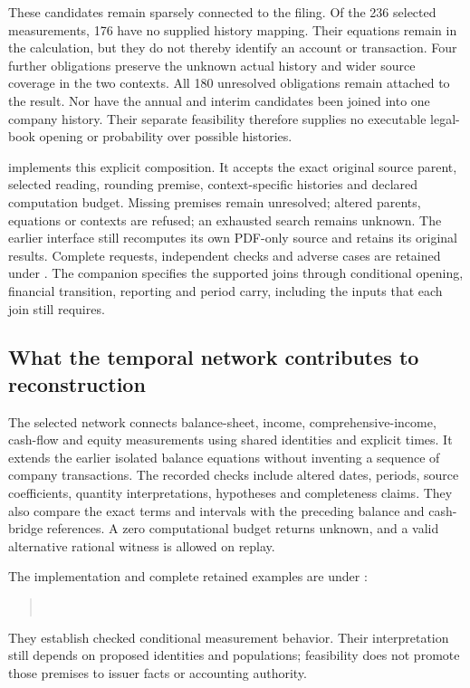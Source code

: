 These candidates remain sparsely connected to the filing. Of the 236 selected
measurements, 176 have no supplied history mapping. Their equations remain
in the calculation, but they do not thereby identify an account or transaction.
Four further obligations preserve the unknown actual history and wider source
coverage in the two contexts. All 180 unresolved obligations remain attached
to the result. Nor have the annual and interim candidates been joined into one
company history. Their separate feasibility therefore supplies no executable
legal-book opening or probability over possible histories.

 implements this explicit composition.
It accepts the exact original source parent, selected reading, rounding premise,
context-specific histories and declared computation budget. Missing premises
remain unresolved; altered parents, equations or contexts are refused; an
exhausted search remains unknown. The earlier interface still recomputes its
own PDF-only source and retains its original results. Complete requests,
independent checks and adverse cases are retained under
.
The companion  specifies the
supported joins through conditional opening, financial transition, reporting
and period carry, including the inputs that each join still requires.

\subsection{What the temporal network contributes to reconstruction}

The selected network connects balance-sheet, income, comprehensive-income,
cash-flow and equity measurements using shared identities and explicit times.
It extends the earlier isolated balance equations without inventing a sequence
of company transactions. The recorded checks include altered dates, periods,
source coefficients, quantity interpretations, hypotheses and completeness
claims. They also compare the exact terms and intervals with the preceding
balance and cash-bridge references. A zero computational budget returns unknown,
and a valid alternative rational witness is allowed on replay.

The implementation and complete retained examples are under
:
\begin{quote}\small
{}\\
\end{quote}
They establish checked conditional measurement behavior. Their interpretation
still depends on proposed identities and populations; feasibility does not
promote those premises to issuer facts or accounting authority.

